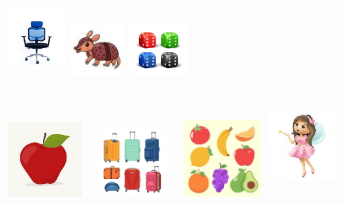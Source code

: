 \includegraphics[width=0.59375in,height=0.78819in]{media/image58.jpg}
\includegraphics[width=0.56458in,height=0.56458in]{media/image59.jpg}
\includegraphics[width=0.61042in,height=0.56250in]{media/image60.jpg}

\includegraphics[width=0.77569in,height=0.78125in]{media/image61.jpg}
\includegraphics[width=0.93472in,height=0.70486in]{media/image55.jpg}
\includegraphics[width=0.85347in,height=0.80208in]{media/image62.jpg}
\includegraphics[width=0.70833in,height=1.05957in]{media/image63.jpg}


